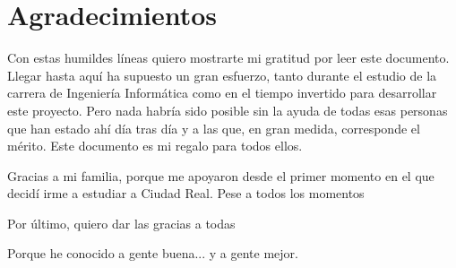 
\chapter{Agradecimientos}

Con estas humildes líneas quiero mostrarte mi gratitud por leer este documento. Llegar hasta aquí ha supuesto un gran esfuerzo, tanto durante el estudio de la carrera de Ingeniería Informática como en el tiempo invertido para desarrollar este proyecto. Pero nada habría sido posible sin la ayuda de todas esas personas que han estado ahí día tras día y a las que, en gran medida, corresponde el mérito. Este documento es mi regalo para todos ellos.

Gracias a mi familia, porque me apoyaron desde el primer momento en el que decidí irme a estudiar a Ciudad Real. Pese a todos los momentos 

Por último, quiero dar las gracias a todas

Porque he conocido a gente buena... y a gente mejor.




